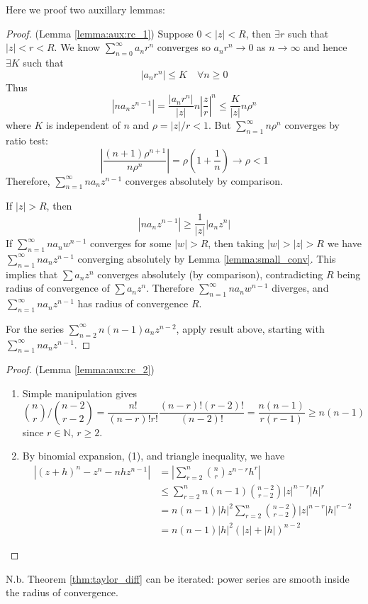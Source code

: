 \documentclass[10pt, a4paper, twoside]{report}
\begin{document}
Here we proof two auxillary lemmas:
\begin{proof}
    (Lemma \ref{lemma:aux:rc_1}) Suppose \(0<|z|<R\), then \(\exists r\) such that \(|z|<r<R\). We know \(\sum_{n=0}^{\infty}a_nr^n\) converges so \(a_nr^n\to 0\) as \(n\to\infty\) and hence \(\exists K\) such that 
    \[|a_nr^n|\leq K\quad\forall n\geq 0\]
    Thus 
    \[|na_nz^{n-1}|=\frac{|a_nr^n|}{|z|}n\left|\frac zr\right|^n\leq\frac K{|z|}n\rho^n\]
    where \(K\) is independent of \(n\) and \(\rho=|z|/r<1\). But \(\sum_{n=1}^{\infty}n\rho^n\) converges by ratio test:
    \[\left|\frac{(n+1)\rho^{n+1}}{n\rho^n}\right|=\rho\left(1+\frac 1n\right)\to\rho<1\]
    Therefore, \(\sum_{n=1}^\infty na_nz^{n-1}\) converges absolutely by comparison.

    If \(|z|>R\), then 
    \[|na_nz^{n-1}|\geq\frac 1{|z|}|a_nz^n|\]
    If \(\sum_{n=1}^{\infty}na_nw^{n-1}\) converges for some \(|w|>R\), then taking \(|w|>|z|>R\) we have \(\sum_{n=1}^{\infty}na_nz^{n-1}\) converging absolutely by Lemma \ref{lemma:small_conv}. This implies that \(\sum a_nz^n\) converges absolutely (by comparison), contradicting \(R\) being radius of convergence of \(\sum a_nz^n\). Therefore \(\sum_{n=1}^{\infty}na_nw^{n-1}\) diverges, and \(\sum_{n=1}^{\infty}na_nz^{n-1}\) has radius of convergence \(R\).

    For the series \(\sum_{n=2}^{\infty}n(n-1)a_nz^{n-2}\), apply result above, starting with \(\sum_{n=1}^{\infty}na_nz^{n-1}\).
\end{proof}
\begin{proof}
    (Lemma \ref{lemma:aux:rc_2})
    \begin{enumerate}
        \item Simple manipulation gives
        \[{\binom nr}/{\binom{n-2}{r-2}}=\frac{n!}{(n-r)!r!}\frac{(n-r)!(r-2)!}{(n-2)!}=\frac{n(n-1)}{r(r-1)}\geq n(n-1)\]
        since \(r\in\mathbb{N}\), \(r\geq 2\).
        \item By binomial expansion, (1), and triangle inequality, we have 
        \begin{align*}
            |(z+h)^n-z^n-nhz^{n-1}|&=\left|\sum_{r=2}^{n}\binom nrz^{n-r}h^r\right| \\
            &\leq\sum_{r=2}^{n}n(n-1)\binom{n-2}{r-2}|z|^{n-r}|h|^r \\
            &=n(n-1)|h|^2\sum_{r=2}^{n}\binom{n-2}{r-2}|z|^{n-r}|h|^{r-2} \\
            &=n(n-1)|h|^2(|z|+|h|)^{n-2}
        \end{align*}
    \end{enumerate}
\end{proof}
N.b. Theorem \ref{thm:taylor_diff} can be iterated: power series are smooth inside the radius of convergence. 
\end{document}
